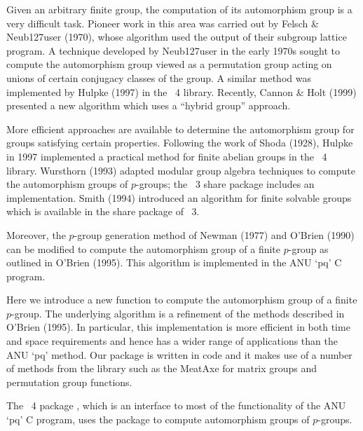 

Given an arbitrary finite group, the computation of its automorphism
group is a very difficult task. Pioneer work in this area was carried 
out by Felsch \&  Neub{\accent127u}ser (1970), whose algorithm used 
the output of their subgroup lattice program. A technique developed 
by Neub{\accent127u}ser in the early 1970s sought to compute the 
automorphism group viewed as a permutation group acting on unions of 
certain conjugacy classes of the group. A similar method was implemented 
by Hulpke (1997) in the {\GAP}~4 library. Recently, Cannon \& Holt (1999) 
presented a new algorithm which uses a ``hybrid group'' approach. 

More efficient approaches are available to determine the automorphism 
group for groups satisfying certain properties. Following the work of 
Shoda (1928), Hulpke in 1997 implemented a practical method for finite 
abelian groups in the {\GAP}~4 library. Wursthorn (1993) adapted modular 
group algebra techniques to compute the automorphism groups of $p$-groups; 
the {\GAP}~3 share package  includes an implementation. Smith 
(1994) introduced an algorithm for finite solvable groups which is 
available in the  share package of {\GAP}~3. 

Moreover, the $p$-group generation method of Newman (1977) and O'Brien 
(1990) can be modified to compute the automorphism group of a finite 
$p$-group as outlined in O'Brien (1995). This algorithm is implemented 
in the ANU `pq' C program. 

Here we introduce a new function to compute the automorphism group of 
a finite $p$-group. The underlying algorithm is a refinement of the
methods described in O'Brien (1995). In particular, this implementation
is more efficient in both time and space requirements and hence has a 
wider range of applications than the ANU `pq' method. Our package is 
written in {\GAP} code and it makes use of a number of methods from the 
{\GAP} library such as the MeatAxe for matrix groups and 
permutation group functions. 

The {\GAP}~4 package , which is an interface to most of
the functionality of the ANU `pq' C program, uses the {\AutPGrp} package
to compute automorphism groups of $p$-groups.

